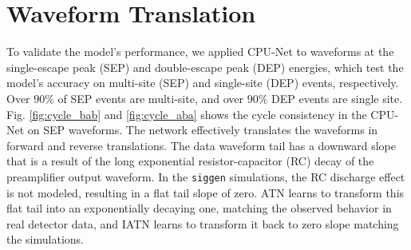 

\section{Waveform Translation}
To validate the model’s performance, we applied CPU-Net to waveforms at the single-escape peak (SEP) and double-escape peak (DEP) energies, which test the model’s accuracy on multi-site (SEP) and single-site (DEP) events, respectively. Over $90\%$ of SEP events are multi-site, and over $90\%$ DEP events are single site. Fig. \ref{fig:cycle_bab} and \ref{fig:cycle_aba}  shows the cycle consistency in the CPU-Net on SEP waveforms. The network effectively translates the waveforms in forward and reverse translations. The data waveform tail has a downward slope that is a result of the long exponential resistor-capacitor (RC) decay of the preamplifier output waveform. In the \texttt{siggen} simulations, the RC discharge effect is not modeled, resulting in a flat tail slope of zero. ATN learns to transform this flat tail into an exponentially decaying one, matching the observed behavior in real detector data, and IATN learns to transform it back to zero slope matching the simulations.


